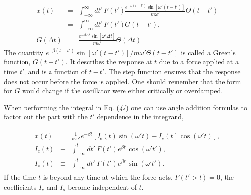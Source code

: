 \documentclass[letterpaper,10pt,english]{sphinxmanual}
\begin{document}
\begin{equation*}
\begin{split}
\begin{eqnarray}\label{eq:Greeny} \tag{44}
x(t)&=&\int_{-\infty}^\infty dt'~F(t')\frac{e^{-\beta(t-t')}\sin[\omega'(t-t')]}{m\omega'}\Theta(t-t')\\
\nonumber
&=&\int_{-\infty}^\infty dt'~F(t')G(t-t'),\\
\nonumber
G(\Delta t)&=&\frac{e^{-\beta\Delta t}\sin[\omega' \Delta t]}{m\omega'}\Theta(\Delta t)
\end{eqnarray}
\end{split}
\end{equation*}
The quantity
\(e^{-\beta(t-t')}\sin[\omega'(t-t')]/m\omega'\Theta(t-t')\) is called a
Green’s function, \(G(t-t')\). It describes the response at \(t\) due to a
force applied at a time \(t'\), and is a function of \(t-t'\). The step
function ensures that the response does not occur before the force is
applied. One should remember that the form for \(G\) would change if the
oscillator were either critically\sphinxhyphen{} or over\sphinxhyphen{}damped.

When performing the integral in Eq. ({\hyperref[\detokenize{chapter4:eq:Greeny}]{\emph{44}}}) one can use
angle addition formulas to factor out the part with the \(t'\)
dependence in the integrand,




\begin{equation*}
\begin{split}
\begin{eqnarray}
\label{eq:Greeny2} \tag{45}
x(t)&=&\frac{1}{m\omega'}e^{-\beta t}\left[I_c(t)\sin(\omega't)-I_s(t)\cos(\omega't)\right],\\
\nonumber
I_c(t)&\equiv&\int_{-\infty}^t dt'~F(t')e^{\beta t'}\cos(\omega't'),\\
\nonumber
I_s(t)&\equiv&\int_{-\infty}^t dt'~F(t')e^{\beta t'}\sin(\omega't').
\end{eqnarray}
\end{split}
\end{equation*}
If the time \(t\) is beyond any time at which the force acts,
\(F(t'>t)=0\), the coefficients \(I_c\) and \(I_s\) become independent of
\(t\).
\end{document}

